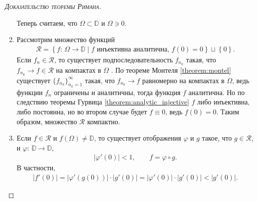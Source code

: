 \documentclass[../complex-analysis.tex]{subfiles}
\begin{document}
\begin{proof}[\normalfont\textsc{Доказательство теоремы Римана}]
\begin{enumerate}
   Теперь считаем, что $ \Omega \subset \mathbb D $ и $ \Omega \ni 0 $.

  \item Рассмотрим множество функций
   \begin{align*}
    \mathcal R = \left\{ f \colon\,\Omega \to \mathbb D \mid f \text{ инъективна аналитична, } f(0) = 0  \right\} \sqcup \left\{ 0 \right\}.
\end{align*} Если $ f_n \in \mathcal R$, то существует подпоследовательность $ f_{n_k} $ такая, что  $ f_{n_k} \to f \in \mathcal R $  на компактах в $ \Omega $ . По теореме Монтеля \eqref{theorem:montel} существует $ \{f_{n_k}\}_{n_k=1}^{\infty}   $ такая, что $ f_{n_k} \to f $ равномерно на компактах в $ \Omega $, ведь функции $ f_n $ ограничены и аналитичны, тогда функция $ f $ аналитична. Но по следствию теоремы Гурвица \eqref{theorem:analytic_injective} $ f $ либо инъективна, либо постоянна, но во втором случае будет $ f \equiv 0 $, ведь $ f(0) = 0 $. Таким образом, множество $ \mathcal R $ компактно.

  \item Если $ f \in \mathcal R $ и $ f(\Omega) \neq \mathbb D $, то существует отображения $ \varphi $ и $ g $ такое, что $ g \in \mathcal R $, и $ \varphi\colon\,\mathbb D \to \mathbb D $,
   \begin{align*}
    \left| \varphi'(0) \right| < 1, \qquad f = \varphi \circ g.
   \end{align*} В частности,
   \begin{align*}
    \left| f'(0) \right| = \left| \varphi'(g(0)) \right| \cdot \left| g'(0) \right| = \left| \varphi'(0) \right| \cdot \left| g'(0) \right| < \left| g'(0) \right|.
   \end{align*}


\end{enumerate}
\end{proof}
\end{document}
